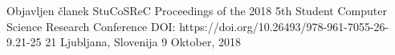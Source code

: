 



\begin{cvhonors}

  \cvhonor
    {Objavljen članek} %
    {StuCoSReC Proceedings of the 2018 5th Student Computer Science Research Conference DOI: https://doi.org/10.26493/978-961-7055-26-9.21-25 21} %
    {Ljubljana, Slovenija} %
    {9 Oktober, 2018} %

\end{cvhonors}

